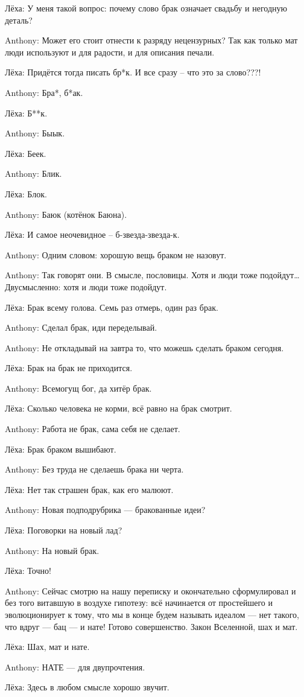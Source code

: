 \begin{miamalist}
  \item[Лёха:] У меня такой вопрос: почему слово брак означает свадьбу и негодную деталь?
  \item[Anthony:] Может его стоит отнести к разряду нецензурных? Так как только мат люди используют и для радости, и для описания печали. %
  \item[Лёха:] Придётся тогда писать бр*к. И все сразу -- что это за слово???!
  \item[Anthony:] Бра*, б*ак.
  \item[Лёха:] Б**к.
  \item[Anthony:] Быык. %
  \item[Лёха:] Беек.
  \item[Anthony:] Блик.
  \item[Лёха:] Блок.
  \item[Anthony:] Баюк (котёнок Баюна).
  \item[Лёха:] И самое неочевидное -- б-звезда-звезда-к.
  \item[Anthony:] Одним словом: хорошую вещь браком не назовут. %
  \item[Anthony:] Так говорят они. В смысле, пословицы. Хотя и люди тоже подойдут\ldots Двусмысленно: хотя и люди тоже подойдут.
  \item[Лёха:] Брак всему голова. Семь раз отмерь, один раз брак.
  \item[Anthony:] Сделал брак, иди переделывай.
  \item[Anthony:] Не откладывай на завтра то, что можешь сделать браком сегодня.
  \item[Лёха:] Брак на брак не приходится.
  \item[Anthony:] Всемогущ бог, да хитёр брак.
  \item[Лёха:] Сколько человека не корми, всё равно на брак смотрит.
  \item[Anthony:] Работа не брак, сама себя не сделает.
  \item[Лёха:] Брак браком вышибают.
  \item[Anthony:] Без труда не сделаешь брака ни черта.
  \item[Лёха:] Нет так страшен брак, как его малюют.
  \item[Anthony:] Новая подподрубрика --- бракованные идеи?
  \item[Лёха:] Поговорки на новый лад?
  \item[Anthony:] На новый брак.
  \item[Лёха:] Точно!
  \item[Anthony:] Сейчас смотрю на нашу переписку и окончательно сформулировал и без того витавшую в воздухе гипотезу: всё начинается от простейшего и эволюционирует к тому, что мы в конце будем называть идеалом --- нет такого, что вдруг --- бац --- и нате! Готово совершенство. Закон Вселенной, шах и мат.
  \item[Лёха:] Шах, мат и нате.
  \item[Anthony:] НАТЕ --- для двупрочтения. %
  \item[Лёха:] Здесь в любом смысле хорошо звучит.
\end{miamalist}

